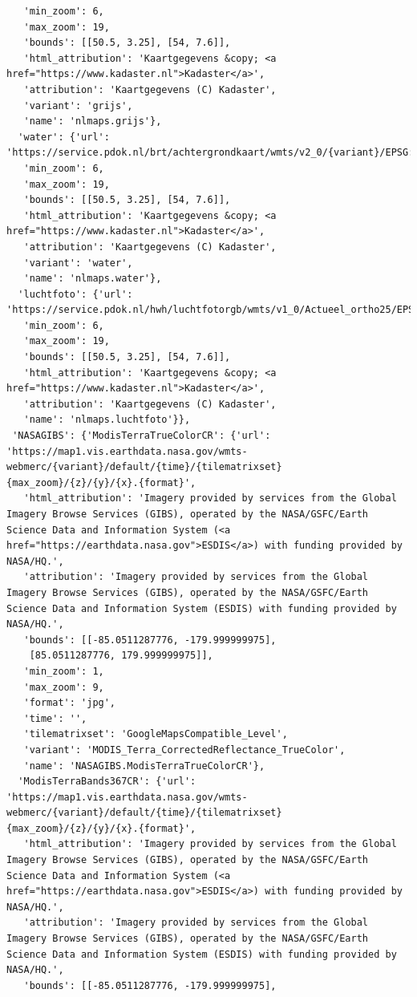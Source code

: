 \documentclass[
  letterpaper,
  DIV=11,
  numbers=noendperiod]{scrreprt}
\begin{document}
\begin{verbatim}
   'min_zoom': 6,
   'max_zoom': 19,
   'bounds': [[50.5, 3.25], [54, 7.6]],
   'html_attribution': 'Kaartgegevens &copy; <a href="https://www.kadaster.nl">Kadaster</a>',
   'attribution': 'Kaartgegevens (C) Kadaster',
   'variant': 'grijs',
   'name': 'nlmaps.grijs'},
  'water': {'url': 'https://service.pdok.nl/brt/achtergrondkaart/wmts/v2_0/{variant}/EPSG:3857/{z}/{x}/{y}.png',
   'min_zoom': 6,
   'max_zoom': 19,
   'bounds': [[50.5, 3.25], [54, 7.6]],
   'html_attribution': 'Kaartgegevens &copy; <a href="https://www.kadaster.nl">Kadaster</a>',
   'attribution': 'Kaartgegevens (C) Kadaster',
   'variant': 'water',
   'name': 'nlmaps.water'},
  'luchtfoto': {'url': 'https://service.pdok.nl/hwh/luchtfotorgb/wmts/v1_0/Actueel_ortho25/EPSG:3857/{z}/{x}/{y}.jpeg',
   'min_zoom': 6,
   'max_zoom': 19,
   'bounds': [[50.5, 3.25], [54, 7.6]],
   'html_attribution': 'Kaartgegevens &copy; <a href="https://www.kadaster.nl">Kadaster</a>',
   'attribution': 'Kaartgegevens (C) Kadaster',
   'name': 'nlmaps.luchtfoto'}},
 'NASAGIBS': {'ModisTerraTrueColorCR': {'url': 'https://map1.vis.earthdata.nasa.gov/wmts-webmerc/{variant}/default/{time}/{tilematrixset}{max_zoom}/{z}/{y}/{x}.{format}',
   'html_attribution': 'Imagery provided by services from the Global Imagery Browse Services (GIBS), operated by the NASA/GSFC/Earth Science Data and Information System (<a href="https://earthdata.nasa.gov">ESDIS</a>) with funding provided by NASA/HQ.',
   'attribution': 'Imagery provided by services from the Global Imagery Browse Services (GIBS), operated by the NASA/GSFC/Earth Science Data and Information System (ESDIS) with funding provided by NASA/HQ.',
   'bounds': [[-85.0511287776, -179.999999975],
    [85.0511287776, 179.999999975]],
   'min_zoom': 1,
   'max_zoom': 9,
   'format': 'jpg',
   'time': '',
   'tilematrixset': 'GoogleMapsCompatible_Level',
   'variant': 'MODIS_Terra_CorrectedReflectance_TrueColor',
   'name': 'NASAGIBS.ModisTerraTrueColorCR'},
  'ModisTerraBands367CR': {'url': 'https://map1.vis.earthdata.nasa.gov/wmts-webmerc/{variant}/default/{time}/{tilematrixset}{max_zoom}/{z}/{y}/{x}.{format}',
   'html_attribution': 'Imagery provided by services from the Global Imagery Browse Services (GIBS), operated by the NASA/GSFC/Earth Science Data and Information System (<a href="https://earthdata.nasa.gov">ESDIS</a>) with funding provided by NASA/HQ.',
   'attribution': 'Imagery provided by services from the Global Imagery Browse Services (GIBS), operated by the NASA/GSFC/Earth Science Data and Information System (ESDIS) with funding provided by NASA/HQ.',
   'bounds': [[-85.0511287776, -179.999999975],

\end{verbatim}
\end{document}
